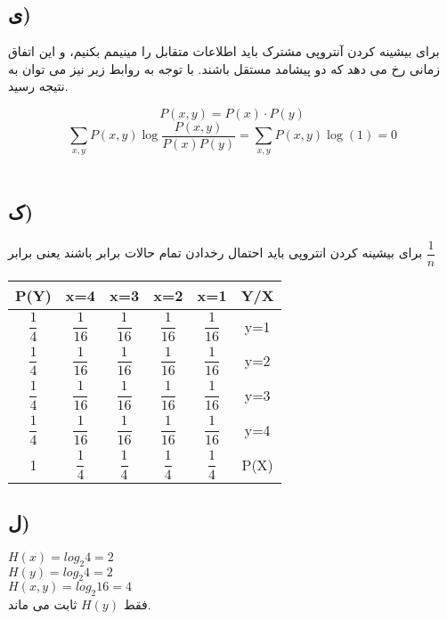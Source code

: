 \subsection{ی)}
برای بیشینه کردن آنتروپی مشترک باید اطلاعات متقابل را مینیمم بکنیم، و این اتفاق زمانی رخ می دهد که دو پیشامد مستقل باشند.
با توجه به روابط زیر نیز می توان به نتیجه رسید.

\null \hfill \[P(x,y) = P(x) \cdot P(y)\] 
\null \hfill  \[\sum_{x,y} P(x,y)\log \dfrac{P(x,y)}{P(x)P(y)} = \sum_{x,y} P(x,y)\log(1) = 0\]  \\


\newpage
\subsection{ک)}
برای بیشینه کردن انتروپی باید احتمال رخدادن تمام حالات برابر باشند یعنی برابر 
 \(\dfrac{1}{n}\)

\begin{table}[h!]
\centering
\begin{tabular}{||c c c c c||c||} 
 \hline
 P(Y) & x=4 & x=3 & x=2 & x=1 & Y/X \\ [0.5ex] 
 \hline\hline
 $\dfrac{1}{4}$ & $\dfrac{1}{16}$ & $\dfrac{1}{16}$ & $\dfrac{1}{16}$ & $\dfrac{1}{16}$ & y=1 \\ 
 $\dfrac{1}{4}$ & $\dfrac{1}{16}$ & $\dfrac{1}{16}$ & $\dfrac{1}{16}$ & $\dfrac{1}{16}$ & y=2 \\
 $\dfrac{1}{4}$ & $\dfrac{1}{16}$ & $\dfrac{1}{16}$ & $\dfrac{1}{16}$ & $\dfrac{1}{16}$ & y=3 \\
 $\dfrac{1}{4}$ & $\dfrac{1}{16}$ & $\dfrac{1}{16}$ & $\dfrac{1}{16}$ & $\dfrac{1}{16}$ & y=4 \\
 1 & $\dfrac{1}{4}$ & $\dfrac{1}{4}$ & $\dfrac{1}{4}$ & $\dfrac{1}{4}$ & P(X) \\ [1ex] 
 \hline
\end{tabular}
\end{table}
\subsection{ل)}
\null \hfill $ H(x) = log_{2} 4 = 2 $ \\
\null \hfill $ H(y) = log_{2} 4 = 2 $ \\
\null \hfill $ H(x,y) = log_{2} 16 = 4 $ \\
فقط 
 \(H(y)\)
ثابت می ماند.
